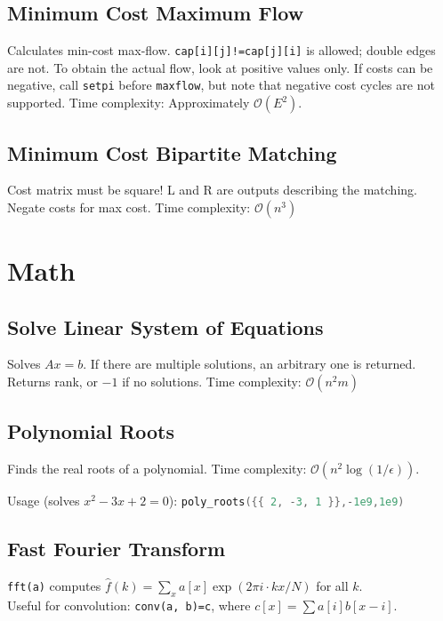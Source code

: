 \documentclass{article}
\begin{document}
\subsection*{Minimum Cost Maximum Flow}

Calculates min-cost max-flow. \lstinline{cap[i][j]!=cap[j][i]} is allowed; double edges are not. To obtain the actual flow, look at positive values only.
If costs can be negative, call \lstinline{setpi} before \lstinline{maxflow}, but note that negative cost cycles are not supported.
Time complexity: Approximately $\mathcal{O}(E^2)$.



\pagebreak

\subsection*{Minimum Cost Bipartite Matching}
Cost matrix must be square! L and R are outputs describing the matching. Negate costs for max cost. Time complexity: $\mathcal{O}(n^3)$


\section*{Math}

\subsection*{Solve Linear System of Equations}
Solves $A x = b$. If there are multiple solutions, an arbitrary one is returned.
Returns rank, or $-1$ if no solutions. Time complexity: $\mathcal{O}(n^2 m)$



\subsection*{Polynomial Roots}

Finds the real roots of a polynomial. Time complexity: $\mathcal{O}(n^2 \log(1/\epsilon))$.

Usage (solves $x^2-3x+2 = 0$): \lstinline[language=C++]|poly_roots({{ 2, -3, 1 }},-1e9,1e9)|




\subsection*{Fast Fourier Transform}
\lstinline{fft(a)} computes $\hat f(k) = \sum_x a[x] \exp(2\pi i \cdot k x / N)$ for all $k$.\\
Useful for convolution: \lstinline{conv(a, b)=c}, where $c[x] = \sum a[i]b[x-i]$.
\end{document}
